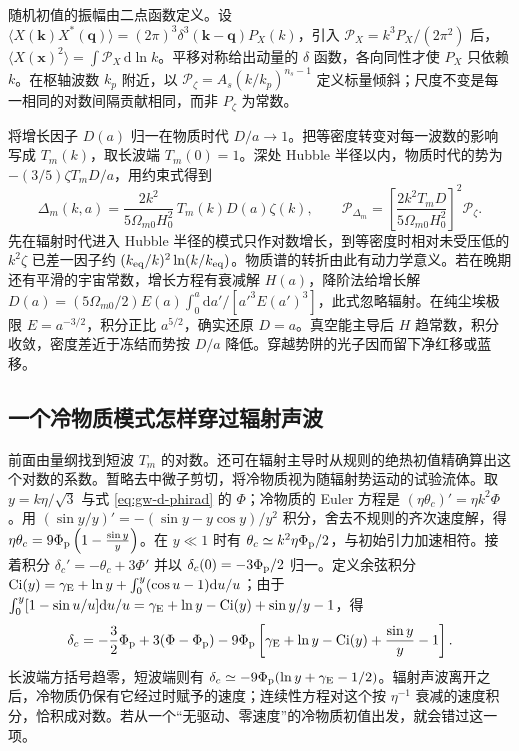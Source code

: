 随机初值的振幅由二点函数定义。设 $\langle X(\bm k)X^*(\bm q)\rangle=(2\pi)^3\delta^3(\bm k-\bm q)P_X(k)$，引入 $\mathcal P_X=k^3P_X/(2\pi^2)$ 后，$\langle X(\bm x)^2\rangle=\int\mathcal P_X\,\mathrm d\ln k$。平移对称给出动量的 $\delta$ 函数，各向同性才使 $P_X$ 只依赖 $k$。在枢轴波数 $k_p$ 附近，以 $\mathcal P_\zeta=A_s(k/k_p)^{n_s-1}$ 定义标量倾斜；尺度不变是每一相同的对数间隔贡献相同，而非 $P_\zeta$ 为常数。

将增长因子 $D(a)$ 归一在物质时代 $D/a\to1$。把等密度转变对每一波数的影响写成 $T_m(k)$，取长波端 $T_m(0)=1$。深处 Hubble 半径以内，物质时代的势为 $-(3/5)\zeta T_m D/a$，用约束式得到
\begin{equation}\label{eq:gw-d-matterpower}
 \Delta_m(k,a)=\frac{2k^2}{5\Omega_{m0}H_0^2}\,T_m(k)D(a)\zeta(k),
 \qquad
 \mathcal P_{\Delta_m}
 =\left[\frac{2k^2T_m D}{5\Omega_{m0}H_0^2}\right]^2\mathcal P_\zeta .
\end{equation}
先在辐射时代进入 Hubble 半径的模式只作对数增长，到等密度时相对未受压低的 $k^2\zeta$ 已差一因子约 $(k_{\rm eq}/k)^2\ln(k/k_{\rm eq})$。物质谱的转折由此有动力学意义。若在晚期还有平滑的宇宙常数，增长方程有衰减解 $H(a)$，降阶法给增长解 $D(a)=(5\Omega_{m0}/2)E(a)\int_0^a\mathrm da'/[a'^3 E(a')^3]$，此式忽略辐射。在纯尘埃极限 $E=a^{-3/2}$，积分正比 $a^{5/2}$，确实还原 $D=a$。真空能主导后 $H$ 趋常数，积分收敛，密度差近于冻结而势按 $D/a$ 降低。穿越势阱的光子因而留下净红移或蓝移。


\subsection{一个冷物质模式怎样穿过辐射声波}

前面由量纲找到短波 $T_m$ 的对数。还可在辐射主导时从规则的绝热初值精确算出这个对数的系数。暂略去中微子剪切，将冷物质视为随辐射势运动的试验流体。取 $y=k\eta/\sqrt3$ 与式 \eqref{eq:gw-d-phirad} 的 $\Phi$；冷物质的 Euler 方程是 $(\eta\theta_c)'=\eta k^2\Phi$。用 $(\sin y/y)'=-(\sin y-y\cos y)/y^2$ 积分，舍去不规则的齐次速度解，得 $\eta\theta_c=9\Phi_{\rm p}\left(1-\frac{\sin y}{y}\right)$。在 $y\ll1$ 时有 $\theta_c\simeq k^2\eta\Phi_{\rm p}/2$，与初始引力加速相符。接着积分 $\delta_c'=-\theta_c+3\Phi'$ 并以 $\delta_c(0)=-3\Phi_{\rm p}/2$ 归一。定义余弦积分 $\operatorname{Ci}(y)=\gamma_{\rm E}+\ln y+\int_0^y(\cos u-1)\mathrm du/u$；由于
$\int_0^y[1-\sin u/u]\mathrm du/u=\gamma_{\rm E}+\ln y-\operatorname{Ci}(y)+\sin y/y-1$，得
\begin{equation}\label{eq:gw-d-coldrad}
 \delta_c=-\frac32\Phi_{\rm p}+3(\Phi-\Phi_{\rm p})
 -9\Phi_{\rm p}\left[\gamma_{\rm E}+\ln y-\operatorname{Ci}(y)
                       +\frac{\sin y}{y}-1\right].
\end{equation}
长波端方括号趋零，短波端则有 $\delta_c\simeq-9\Phi_{\rm p}(\ln y+\gamma_{\rm E}-1/2)$。辐射声波离开之后，冷物质仍保有它经过时赋予的速度；连续性方程对这个按 $\eta^{-1}$ 衰减的速度积分，恰积成对数。若从一个“无驱动、零速度”的冷物质初值出发，就会错过这一项。


